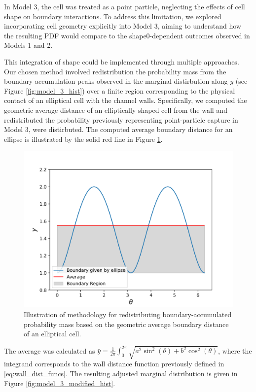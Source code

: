 In Model 3, the cell was treated as a point particle, neglecting the effects of cell shape on boundary interactions. 
To address this limitation, we explored incorporating cell geometry explicitly into Model 3, aiming to understand how the 
resulting PDF would compare to the shape0-dependent outcomes observed in Models 1 and 2.

This integration of shape could be implemented through multiple approaches. Our chosen method involved redistribution 
the probability mass from the boundary accumulation peaks observed in the marginal distirbution along $y$ (see Figure 
\ref{fig:model_3_hist}) over a finite region corresponding to the physical contact of an elliptical cell with the 
channel walls. Specifically, we computed the geometric average distance of an elliptically shaped cell from the 
wall and redistributed the probability previously representing 
point-particle capture in Model 3, were distirbuted. The computed average boundary distance for an ellipse is
illustrated by the solid red line in Figure \ref{fig:average_boundary}.

\begin{figure}[htbp]
    \centering
    \includegraphics[scale=0.4]{graphics/average_boundary.png}
    \caption{Illustration of methodology for redistributing boundary-accumulated 
    probability mass based on the geometric average boundary distance of an elliptical cell.}
    \label{fig:average_boundary}
\end{figure}

The average was calculated as $\bar{y} = \frac{1}{2\pi}\int_{0}^{2\pi}\sqrt{a^2\sin^2(\theta) + b^2\cos^2(\theta)}$,
where the integrand corresponds to the wall distance function previously defined in \eqref{eq:wall_dist_funcs}.
The resulting adjusted marginal distribution is given in Figure \ref{fig:model_3_modified_hist}.

